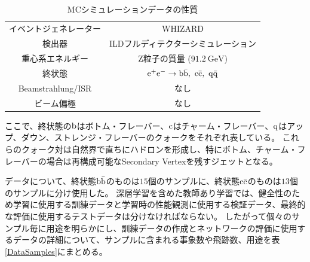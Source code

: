 \begin{table}[htb]
 \centering
　\small
  \begin{tabular}{c c} \hline
    イベントジェネレーター & WHIZARD\\
    検出器 & ILDフルディテクターシミュレーション\\
    重心系エネルギー & Z粒子の質量 ($91.2\ \mathrm{GeV}$)\\ 
    終状態 & $\rm e^+ e^- \to b\bar{b},\  c\bar{c},\  q\bar{q}$\\ 
    Beamstrahlung/ISR & なし\\
    ビーム偏極 & なし\\\hline
  \end{tabular}
  \caption{MCシミュレーションデータの性質}
  \label{MCSimulationDataProperty}
\end{table}

ここで、終状態の$\rm b$はボトム・フレーバー、$\rm c$はチャーム・フレーバー、$\rm q$はアップ、ダウン、ストレンジ・フレーバーのクォークをそれぞれ表している。
これらのクォーク対は自然界で直ちにハドロンを形成し、特にボトム、チャーム・フレーバーの場合は再構成可能なSecondary Vertexを残すジェットとなる。

データについて、終状態$\rm b\bar{b}$のものは$15$個のサンプルに、終状態$\rm c\bar{c}$のものは$13$個のサンプルに分け使用した。
深層学習を含めた教師あり学習では、健全性のため学習に使用する訓練データと学習時の性能観測に使用する検証データ、最終的な評価に使用するテストデータは分けなければならない。
したがって個々のサンプル毎に用途を明らかにし、訓練データの作成とネットワークの評価に使用するデータの詳細について、サンプルに含まれる事象数や飛跡数、用途を表\ref{DataSamples}にまとめる。


